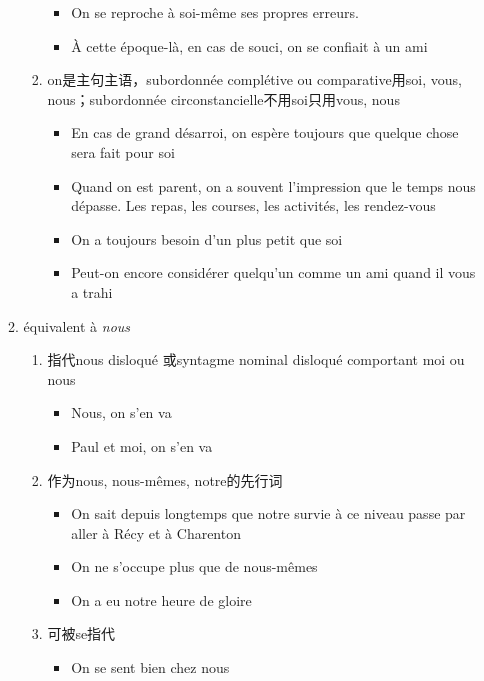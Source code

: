 \documentclass[UTF8]{report}
\begin{document}
\begin{enumerate}
\begin{enumerate}
\begin{enumerate}
        \begin{itemize}
            \item On se reproche à soi-même ses propres erreurs.
            \item À cette époque-là, en cas de souci, on se confiait à un ami
        \end{itemize}
        \item on是主句主语，subordonnée complétive ou comparative用soi, vous, nous；subordonnée circonstancielle不用soi只用vous, nous
        \begin{itemize}
            \item En cas de grand désarroi, on espère toujours que quelque chose sera fait pour soi
            \item Quand on est parent, on a souvent l’impression que le temps nous dépasse. Les repas, les courses, les activités, les rendez-vous 
            \item On a toujours besoin d’un plus petit que soi
            \item Peut-on encore considérer quelqu’un comme un ami quand il vous a trahi
        \end{itemize}
    \end{enumerate}
    \item équivalent à \textit{nous}
    \begin{enumerate}
        \item 指代nous disloqué 或syntagme nominal disloqué comportant moi ou nous
        \begin{itemize}
            \item Nous, on s’en va
            \item Paul et moi, on s’en va
        \end{itemize}
        \item 作为nous, nous-mêmes, notre的先行词
        \begin{itemize}
            \item On sait depuis longtemps que notre survie à ce niveau passe par aller à Récy et à Charenton
            \item On ne s’occupe plus que de nous-mêmes
            \item On a eu notre heure de gloire
        \end{itemize}
        \item 可被se指代
        \begin{itemize}
            \item On se sent bien chez nous
        \end{itemize}

\end{enumerate}
\end{enumerate}
\end{enumerate}
\end{document}
